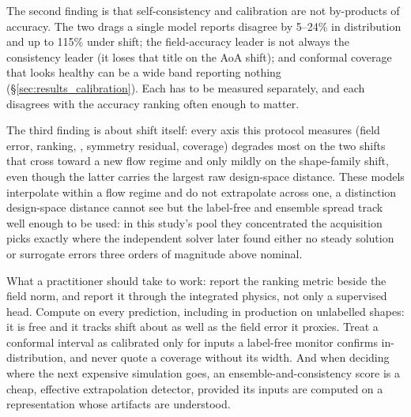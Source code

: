 The second finding is that self-consistency and calibration are not
by-products of accuracy. The two drags a single model reports disagree by
5--24\% in distribution and up to 115\% under shift; the field-accuracy
leader is not always the consistency leader (it loses that title on the AoA
shift); and
conformal coverage that looks healthy can be a wide band reporting nothing
(\S\ref{sec:results_calibration}). Each has to be measured separately, and
each disagrees with the accuracy ranking often enough to matter.

The third finding is about shift itself: every axis this protocol measures
(field error, ranking, \FSC, symmetry residual, coverage) degrades most on
the two shifts that cross toward a new flow regime and only mildly on the
shape-family shift, even though the latter carries the largest raw
design-space distance. These models interpolate within a flow regime and do
not extrapolate across one, a distinction design-space distance cannot see
but the label-free \FSC{} and ensemble spread track well enough to be used:
in this study's pool they concentrated the acquisition picks exactly where
the independent solver later found either no steady solution or surrogate
errors three orders of magnitude above nominal.

What a practitioner should take to work: report the ranking metric beside
the field norm, and report it through the integrated physics, not only a
supervised head. Compute \FSC{} on every prediction, including in production
on unlabelled shapes: it is free and it tracks shift about as well as the
field error it proxies. Treat a conformal interval as calibrated only for
inputs a label-free monitor confirms in-distribution, and never quote a
coverage without its width. And when deciding where the next expensive
simulation goes, an ensemble-and-consistency score is a cheap, effective
extrapolation detector, provided its inputs are computed on a representation
whose artifacts are understood.

